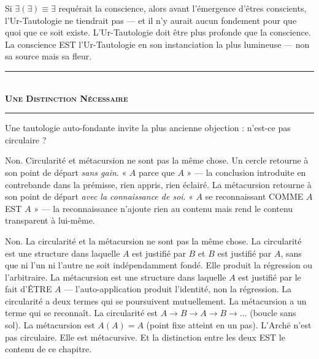 \documentclass[10pt, openany, oneside]{book}
\renewcommand{\normalsize}{\fontsize{10}{13}\selectfont}
\begin{document}
Si $\exists(\exists) \equiv \exists$ requérait la conscience, alors avant l'émergence d'êtres conscients, l'Ur-Tautologie ne tiendrait pas --- et il n'y aurait aucun fondement pour que quoi que ce soit existe. L'Ur-Tautologie doit être plus profonde que la conscience. La conscience EST l'Ur-Tautologie en son instanciation la plus lumineuse --- non sa source mais sa fleur.

\vspace{1.5em}


\begin{center}
    \rule{0.3\textwidth}{0.4pt}\\[0.5em]
    {\normalsize\bfseries\scshape Une Distinction Nécessaire}\\[0.3em]
    \rule{0.3\textwidth}{0.4pt}
\end{center}

\vspace{1em}

\noindent Une tautologie auto-fondante invite la plus ancienne objection : n'est-ce pas circulaire ?

Non. Circularité et métacursion ne sont pas la même chose. Un cercle retourne à son point de départ \textit{sans gain}. « $A$ parce que $A$ » --- la conclusion introduite en contrebande dans la prémisse, rien appris, rien éclairé. La métacursion retourne à son point de départ \textit{avec la connaissance de soi}. « $A$ se reconnaissant COMME $A$ EST $A$ » --- la reconnaissance n'ajoute rien au contenu mais rend le contenu transparent à lui-même.

\noindent Non. La circularité et la métacursion ne sont pas la même chose. La circularité est une structure dans laquelle $A$ est justifié par $B$ et $B$ est justifié par $A$, sans que ni l'un ni l'autre ne soit indépendamment fondé. Elle produit la régression ou l'arbitraire. La métacursion est une structure dans laquelle $A$ est justifié par le fait d'ÊTRE $A$ --- l'auto-application produit l'identité, non la régression. La circularité a deux termes qui se poursuivent mutuellement. La métacursion a un terme qui se reconnaît. La circularité est $A \to B \to A \to B \to \ldots$ (boucle sans sol). La métacursion est $A(A) = A$ (point fixe atteint en un pas). L'Arch\={e} n'est pas circulaire. Elle est métacursive. Et la distinction entre les deux EST le contenu de ce chapitre.
\end{document}
